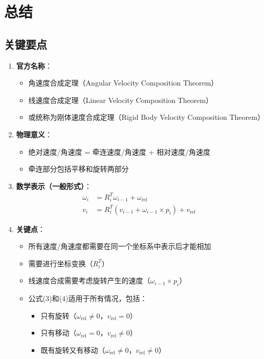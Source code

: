 \documentclass[12pt,a4paper]{article}
\begin{document}
\section{总结}

\subsection{关键要点}

\begin{enumerate}
\item \textbf{官方名称}：
\begin{itemize}
\item 角速度合成定理（Angular Velocity Composition Theorem）
\item 线速度合成定理（Linear Velocity Composition Theorem）
\item 或统称为刚体速度合成定理（Rigid Body Velocity Composition Theorem）
\end{itemize}

\item \textbf{物理意义}：
\begin{itemize}
\item 绝对速度/角速度 = 牵连速度/角速度 + 相对速度/角速度
\item 牵连部分包括平移和旋转两部分
\end{itemize}

\item \textbf{数学表示（一般形式）}：
\begin{align}
\omega_i &= R_i^T \omega_{i-1} + \omega_{\text{rel}} \tag{3} \\
v_i &= R_i^T (v_{i-1} + \omega_{i-1} \times p_i) + v_{\text{rel}} \tag{4}
\end{align}

\item \textbf{关键点}：
\begin{itemize}
\item 所有速度/角速度都需要在同一个坐标系中表示后才能相加
\item 需要进行坐标变换（$R_i^T$）
\item 线速度合成需要考虑旋转产生的速度（$\omega_{i-1} \times p_i$）
\item 公式(3)和(4)适用于所有情况，包括：
\begin{itemize}
\item 只有旋转（$\omega_{\text{rel}} \neq 0$，$v_{\text{rel}} = 0$）
\item 只有移动（$\omega_{\text{rel}} = 0$，$v_{\text{rel}} \neq 0$）
\item 既有旋转又有移动（$\omega_{\text{rel}} \neq 0$，$v_{\text{rel}} \neq 0$）
\end{itemize}
\end{itemize}
\end{enumerate}
\end{document}
